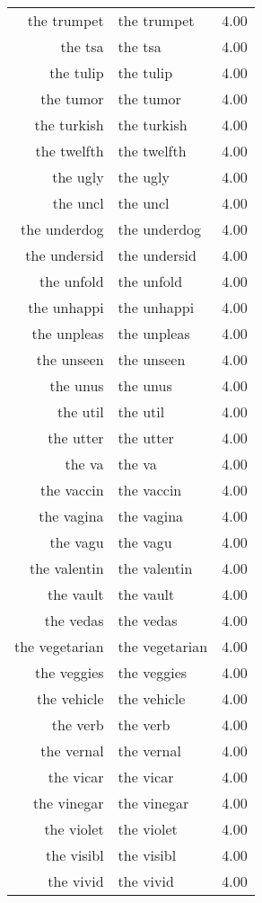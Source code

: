 \begin{table}[ht]
\begin{tabular}{rlr}
  the trumpet & the trumpet & 4.00 \\ 
  the tsa & the tsa & 4.00 \\ 
  the tulip & the tulip & 4.00 \\ 
  the tumor & the tumor & 4.00 \\ 
  the turkish & the turkish & 4.00 \\ 
  the twelfth & the twelfth & 4.00 \\ 
  the ugly & the ugly & 4.00 \\ 
  the uncl & the uncl & 4.00 \\ 
  the underdog & the underdog & 4.00 \\ 
  the undersid & the undersid & 4.00 \\ 
  the unfold & the unfold & 4.00 \\ 
  the unhappi & the unhappi & 4.00 \\ 
  the unpleas & the unpleas & 4.00 \\ 
  the unseen & the unseen & 4.00 \\ 
  the unus & the unus & 4.00 \\ 
  the util & the util & 4.00 \\ 
  the utter & the utter & 4.00 \\ 
  the va & the va & 4.00 \\ 
  the vaccin & the vaccin & 4.00 \\ 
  the vagina & the vagina & 4.00 \\ 
  the vagu & the vagu & 4.00 \\ 
  the valentin & the valentin & 4.00 \\ 
  the vault & the vault & 4.00 \\ 
  the vedas & the vedas & 4.00 \\ 
  the vegetarian & the vegetarian & 4.00 \\ 
  the veggies & the veggies & 4.00 \\ 
  the vehicle & the vehicle & 4.00 \\ 
  the verb & the verb & 4.00 \\ 
  the vernal & the vernal & 4.00 \\ 
  the vicar & the vicar & 4.00 \\ 
  the vinegar & the vinegar & 4.00 \\ 
  the violet & the violet & 4.00 \\ 
  the visibl & the visibl & 4.00 \\ 
  the vivid & the vivid & 4.00 \\ 

\end{tabular}
\end{table}
